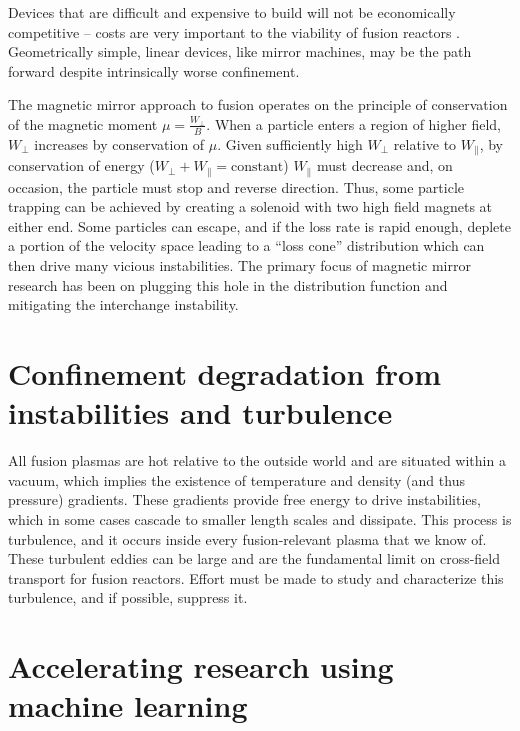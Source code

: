 Devices that are difficult and expensive to build will not be economically competitive -- costs are very important to the viability of fusion reactors \cite{schwartz_value_2023}. Geometrically simple, linear devices, like mirror machines, may be the path forward despite intrinsically worse confinement. 

The magnetic mirror approach to fusion \cite{Post_1987} operates on the principle of conservation of the magnetic moment $\mu = \frac{W_\perp}{B}$. When a particle enters a region of higher field, $W_\perp$ increases by conservation of $\mu$. Given sufficiently high $W_\perp$ relative to $W_\parallel$, by conservation of energy ($W_\perp + W_\parallel = \text{constant}$) $W_\parallel$ must decrease and, on occasion, the particle must stop and reverse direction. Thus, some particle trapping can be achieved by creating a solenoid with two high field magnets at either end. Some particles can escape, and if the loss rate is rapid enough, deplete a portion of the velocity space leading to a ``loss cone'' distribution which can then drive many vicious instabilities. The primary focus of magnetic mirror research has been on plugging this hole in the distribution function and mitigating the interchange instability.

\section{Confinement degradation from instabilities and turbulence}

All fusion plasmas are hot relative to the outside world and are situated within a vacuum, which implies the existence of temperature and density (and thus pressure) gradients. These gradients provide free energy to drive instabilities, which in some cases cascade to smaller length scales and dissipate. This process is turbulence, and it occurs inside every fusion-relevant plasma that we know of. These turbulent eddies can be large and are the fundamental limit on cross-field transport for fusion reactors. Effort must be made to study and characterize this turbulence, and if possible, suppress it. 

\section{Accelerating research using machine learning}

